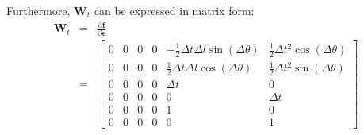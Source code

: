 \documentclass[12pt, a4paper]{article}
\begin{document}
Furthermore, $\bm{W}_{t}$ can be expressed in matrix form:
\begin{eqnarray*}
  \bm{W}_{t} & = & \frac{\partial\bm{f}}{\partial\bm{\epsilon}}\\
  & = & \begin{bmatrix}
    0 & 0 & 0 & 0 & -\frac{1}{2}\Delta t\Delta l\sin(\Delta\theta) & \frac{1}{2}\Delta t^{2}\cos(\Delta\theta)\\
    0 & 0 & 0 & 0 & \frac{1}{2}\Delta t\Delta l\cos(\Delta\theta) & \frac{1}{2}\Delta t^{2}\sin(\Delta\theta)\\
    0 & 0 & 0 & 0 & \Delta t & 0\\
    0 & 0 & 0 & 0 & 0 & \Delta t\\
    0 & 0 & 0 & 0 & 1 & 0\\
    0 & 0 & 0 & 0 & 0 & 1
  \end{bmatrix}
\end{eqnarray*}
\end{document}
